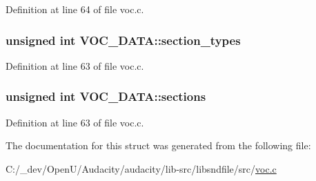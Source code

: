 Definition at line 64 of file voc.\+c.

\subsubsection[{\texorpdfstring{section\+\_\+types}{section_types}}]{\setlength{\rightskip}{0pt plus 5cm}unsigned {\bf int} V\+O\+C\+\_\+\+D\+A\+T\+A\+::section\+\_\+types}\hypertarget{struct_v_o_c___d_a_t_a_a2f7908cf1039ad00367dcfcd0b97c7b7}{}\label{struct_v_o_c___d_a_t_a_a2f7908cf1039ad00367dcfcd0b97c7b7}


Definition at line 63 of file voc.\+c.

\subsubsection[{\texorpdfstring{sections}{sections}}]{\setlength{\rightskip}{0pt plus 5cm}unsigned {\bf int} V\+O\+C\+\_\+\+D\+A\+T\+A\+::sections}\hypertarget{struct_v_o_c___d_a_t_a_ae382ee77c3b40079bb08efe509bf9c90}{}\label{struct_v_o_c___d_a_t_a_ae382ee77c3b40079bb08efe509bf9c90}


Definition at line 63 of file voc.\+c.



The documentation for this struct was generated from the following file\+:\begin{DoxyCompactItemize}
\item 
C\+:/\+\_\+dev/\+Open\+U/\+Audacity/audacity/lib-\/src/libsndfile/src/\hyperlink{voc_8c}{voc.\+c}\end{DoxyCompactItemize}
